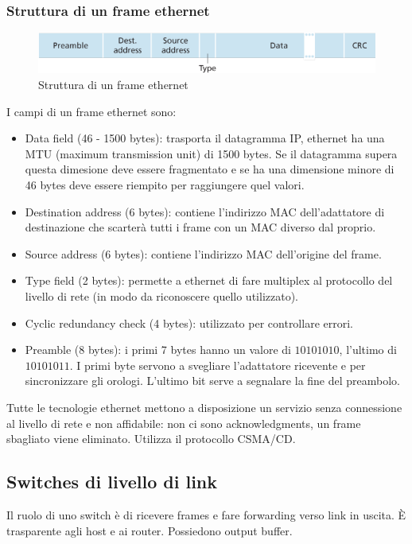 \subsubsection{Struttura di un frame ethernet}
\begin{figure}[h]
\includegraphics[width=\textwidth]{EthernetFrame.png}
\caption{Struttura di un frame ethernet}
\end{figure}
I campi di un frame ethernet sono:
\begin{itemize}
\item Data field (46 - 1500 bytes): trasporta il datagramma IP, ethernet ha una MTU (maximum transmission unit) di 1500 bytes. Se il datagramma supera questa dimesione deve essere fragmentato e se ha
una dimensione minore di 46 bytes deve essere riempito per raggiungere quel valori.
\item Destination address (6 bytes): contiene l'indirizzo MAC dell'adattatore di destinazione che scarter\`a tutti i frame con un MAC diverso dal proprio.
\item Source address (6 bytes): contiene l'indirizzo MAC dell'origine del frame.
\item Type field (2 bytes): permette a ethernet di fare multiplex al protocollo del livello di rete (in modo da riconoscere quello utilizzato).
\item Cyclic redundancy check (4 bytes): utilizzato per controllare errori.
\item Preamble (8 bytes): i primi 7 bytes hanno un valore di $10101010$, l'ultimo di $10101011$. I primi byte servono a svegliare l'adattatore ricevente e per sincronizzare gli orologi. L'ultimo bit serve a 
segnalare la fine del preambolo.
\end{itemize}
Tutte le tecnologie ethernet mettono a disposizione un servizio senza connessione al livello di rete e non affidabile: non ci sono acknowledgments, un frame sbagliato viene eliminato. Utilizza il protocollo 
CSMA/CD.
\subsection{Switches di livello di link}
Il ruolo di uno switch \`e di ricevere frames e fare forwarding verso link in uscita. \`E trasparente agli host e ai router. Possiedono output buffer.
